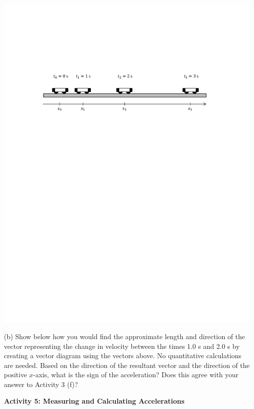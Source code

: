 \vspace{0.3cm}
{\par\centering \includegraphics{changing/carts_const_a.pdf} \par}
\vspace{0.3cm}

(b) Show below how you would find the approximate length and direction of the
vector representing the change in velocity between the times 1.0 s and 2.0 s
by creating a vector diagram using the vectors above. No quantitative 
calculations are needed. Based on the direction of the resultant vector and 
the direction of the positive $x$-axis, what is the sign of the acceleration? 
Does this agree with your answer to Activity 3 (f)?
\answerspace{20mm}

\textbf{Activity 5: Measuring and Calculating Accelerations}

